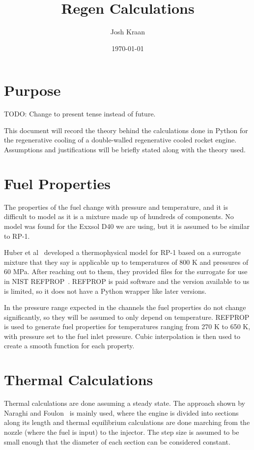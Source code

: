 \documentclass[11pt]{article}
\title{Regen Calculations}
\author{Josh Kraan}
\date{\today}
\begin{document}
\maketitle

\section{Purpose}

TODO: Change to present tense instead of future.

This document will record the theory behind the calculations done in Python for the regenerative cooling of a double-walled regenerative cooled rocket engine. Assumptions and justifications will be briefly stated along with the theory used.

\section{Fuel Properties}

The properties of the fuel change with pressure and temperature, and it is difficult to model as it is a mixture made up of hundreds of components. No model was found for the Exxsol D40 we are using, but it is assumed to be similar to RP-1.

Huber et al~\cite{huber_preliminary_2009} developed a thermophysical model for RP-1 based on a surrogate mixture that they say is applicable up to temperatures of 800 K and pressures of 60 MPa. After reaching out to them, they provided files for the surrogate for use in NIST REFPROP~\cite{lemmon_rp10}. REFPROP is paid software and the version available to us is limited, so it does not have a Python wrapper like later versions.

In the pressure range expected in the channels the fuel properties do not change significantly, so they will be assumed to only depend on temperature. REFPROP is used to generate fuel properties for temperatures ranging from 270 K to 650 K, with pressure set to the fuel inlet pressure. Cubic interpolation is then used to create a smooth function for each property.

\section{Thermal Calculations}

Thermal calculations are done assuming a steady state. The approach shown by Naraghi and Foulon~\cite{naraghi_simple_2008} is mainly used, where the engine is divided into sections along its length and thermal equilibrium calculations are done marching from the nozzle (where the fuel is input) to the injector. The step size is assumed to be small enough that the diameter of each section can be considered constant.
\end{document}
